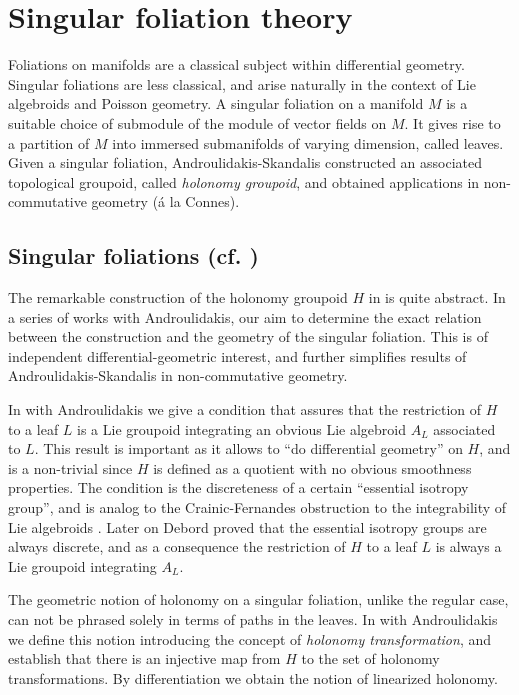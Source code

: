 \documentclass[11pt]{amsart}
\begin{document}
\section{Singular foliation theory} 
Foliations on manifolds are a classical subject within differential geometry. Singular foliations are  less 
classical, and arise naturally in the context of Lie algebroids and Poisson geometry. 
A singular foliation on a manifold $M$ is a suitable choice of submodule of the module of vector fields on 
$M$. It gives rise to a partition of $M$ into immersed submanifolds of varying dimension, called leaves. Given a singular foliation, Androulidakis-Skandalis \cite{AndrSk}  constructed an associated topological groupoid, called \emph{holonomy groupoid}, and obtained applications in non-commutative geometry (\'a la Connes).

\subsection{Singular foliations (cf. \cite{AZ2}\cite{AZ1})}

The remarkable construction of the holonomy groupoid $H$ in \cite{AndrSk} is   quite abstract. In a series of works with Androulidakis, our aim to determine the exact relation between the construction and the geometry of the singular foliation. This is of independent differential-geometric interest, and further simplifies results of Androulidakis-Skandalis in   non-commutative geometry.

In   \cite{AZ1} with Androulidakis we give a condition that
assures that the 
 restriction of $H$ to a leaf $L$ is a Lie groupoid integrating  an obvious Lie algebroid $A_L$ associated to $L$.
 This result is important as it allows to ``do differential geometry'' on $H$, and is a non-trivial
since $H$ is defined as a quotient with no obvious smoothness properties. The condition is the discreteness  of a certain ``essential isotropy group'', and is analog to the Crainic-Fernandes obstruction to the integrability of Lie algebroids \cite{CrFeLie}. Later on Debord \cite{De13} proved that
the essential isotropy groups are always discrete, and as a consequence 
the   restriction of $H$ to a leaf $L$ is always a Lie groupoid integrating   $A_L$.

The geometric notion of holonomy on a singular foliation, unlike the regular case, can not be phrased solely in terms of paths in the leaves. 
In   \cite{AZ2} with Androulidakis we 
define this notion introducing the concept of \emph{holonomy transformation}, and establish that there is an injective map   from $H$ to the set of holonomy transformations.  
By differentiation we obtain the notion of linearized holonomy.
\end{document}
